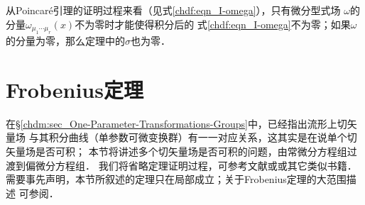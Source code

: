 \begin{remark}\label{chdf:rek_poincare-lemma}
    从Poincar\'{e}引理的证明过程来看（见式\eqref{chdf:eqn_I-omega}），只有微分型式场
    $\omega$的分量$\omega_{\mu_{1}\cdots \mu_{r}}(x)$不为零时才能使得积分后的
    式\eqref{chdf:eqn_I-omega}不为零；如果$\omega$的分量为零，那么定理中的$\sigma$也为零．
\end{remark}










\section{Frobenius定理}\label{chdf:sec_frobenius}

在\S \ref{chdm:sec_One-Parameter-Transformations-Groups}中，已经指出流形上切矢量场
与其积分曲线（单参数可微变换群）有一一对应关系，这其实是在说单个切矢量场是否可积；
本节将讲述多个切矢量场是否可积的问题，由常微分方程组过渡到偏微分方程组．
我们将省略定理证明过程，可参考文献\parencite[\S 1.4]{cc2001-zh}或\parencite[\S 3.4]{chenwh2001}或其它类似书籍． 
需要事先声明，本节所叙述的定理只在局部成立；关于Frobenius定理的大范围描述
可参阅\parencite[\S 6.6-6.7]{spivak-dif-1}．

